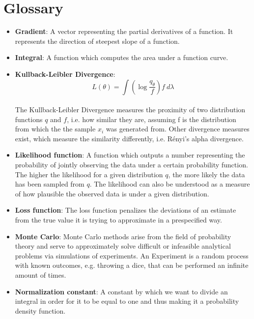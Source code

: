 
\section{Glossary}
\begin{itemize}
    
    \item \textbf{Gradient}: A vector representing the partial derivatives of a function. 
    It represents the direction of steepest slope of a function. 
    
    \item \textbf{Integral}: A function which computes the area under a function curve.
    
    \item \textbf{Kullback-Leibler Divergence}: 
    $$L(\theta) =\displaystyle\int \left(\log \frac{q_\theta}{f}\right) f \ d \lambda$$ \\
    The Kullback-Leibler Divergence measures the proximity of two distribution 
    functions $q$ and $f$, i.e. how similar they are, assuming f is the distribution 
    from which the the sample $x_i$ was generated from. Other divergence measures exist, which 
    measure the similarity differently, i.e. Rényi's alpha divergence. 
    
    \item \textbf{Likelihood function}: A function which outputs a number representing the 
    probability of jointly observing the data under a certain probability function.
    The higher the likelihood for a given distribution $q$, the more likely the 
    data has been sampled from $q$. The likelihood can also be understood as a 
    measure of how plausible the observed data is under a given distribution. 

    \item \textbf{Loss function}: The loss function penalizes the 
    deviations of an estimate from the true value it is 
    trying to approximate in a prespecified way. 
    
    \item \textbf{Monte Carlo}: Monte Carlo methods arise from the field of probability theory and  
    serve to approximately solve difficult or infeasible analytical problems via 
    simulations of experiments. An Experiment is a random process with known 
    outcomes, e.g. throwing a dice, that can be performed an infinite amount of times.   
    
    \item \textbf{Normalization constant}: A constant by which we 
    want to divide an integral in order for it to be equal 
    to one and thus making it a probability density function.  
    

\end{itemize}
